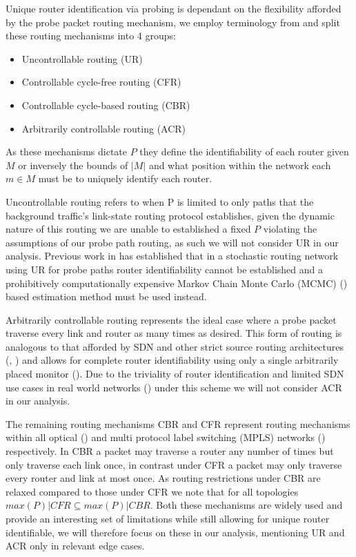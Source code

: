     Unique router identification via probing is dependant on the flexibility afforded by the probe packet routing mechanism, we employ terminology from \cite{he_network_2021} and split these routing mechanisms into 4 groups: \begin{itemize}
        \item Uncontrollable routing (UR)
        \item Controllable cycle-free routing (CFR)
        \item Controllable cycle-based routing (CBR)
        \item Arbitrarily controllable routing (ACR)
    \end{itemize}As these mechanisms dictate $P$ they define the identifiability of each router given $M$ or inversely the bounds of $|M|$ and what position within the network each $m\in M$ must be to uniquely identify each router.\par
    Uncontrollable routing refers to when P is limited to only paths that the background traffic's link-state routing protocol establishes, given the dynamic nature of this routing we are unable to established a fixed $P$ violating the assumptions of our probe path routing, as such we will not consider UR in our analysis. Previous work in \cite{barnes_stochastic_2020} has established that in a stochastic routing network using UR for probe paths router identifiability cannot be established and a prohibitively computationally expensive Markov Chain Monte Carlo (MCMC) (\cite{dellaportas_bayesian_2002}) based estimation method must be used instead.\par
    
    Arbitrarily controllable routing represents the ideal case where a probe packet traverse every link and router as many times as desired. This form of routing is analogous to that afforded by SDN and other strict source routing architectures (\cite{university_of_southern_california_darpa_1981}, \cite{open_networking_foundation_openflow_2015}) and allows for complete router identifiability using only a single arbitrarily placed monitor (\cite{he_network_2021}). Due to the triviality of router identification and limited SDN use cases in real world networks (\cite{jarschel_interfaces_2014}) under this scheme we will not consider ACR in our analysis.\par
    
    The remaining routing mechanisms CBR and CFR represent routing mechanisms within all optical (\cite{ahuja_srlg_2011}) and multi protocol label switching (MPLS) networks (\cite{rosen_multiprotocol_2001}) respectively. In CBR a packet may traverse a router any number of times but only traverse each link once, in contrast under CFR a packet may only traverse every router and link at most once. As routing restrictions under CBR are relaxed compared to those under CFR we note that for all topologies $max(P)|CFR \subseteq max(P)|CBR$. Both these mechanisms are widely used and provide an interesting set of limitations while still allowing for unique router identifiable, we will therefore focus on these in our analysis, mentioning UR and ACR only in relevant edge cases.

